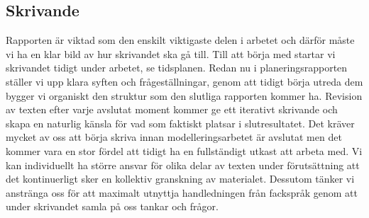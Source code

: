 \subsection{Skrivande}
Rapporten är viktad som den enskilt viktigaste delen i arbetet och därför måste vi ha en klar bild av hur skrivandet ska gå till. Till att börja med startar vi skrivandet tidigt under arbetet, se tidsplanen. Redan nu i planeringsrapporten ställer vi upp klara syften och frågeställningar, genom att tidigt börja utreda dem bygger vi organiskt den struktur som den slutliga rapporten kommer ha. Revision av texten efter varje avslutat moment kommer ge ett iterativt skrivande och skapa en naturlig känsla för vad som faktiskt platsar i slutresultatet. 
Det kräver mycket av oss att börja skriva innan modelleringsarbetet är avslutat men det kommer vara en stor fördel att tidigt ha en fullständigt utkast att arbeta med. Vi kan individuellt ha större ansvar för olika delar av texten under förutsättning att det kontinuerligt sker en kollektiv granskning av materialet. Dessutom tänker vi anstränga oss för att maximalt utnyttja handledningen från fackspråk genom att under skrivandet samla på oss tankar och frågor.


